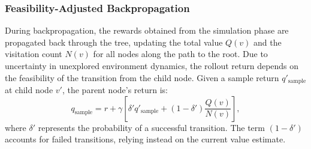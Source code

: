 
\subsubsection{Feasibility-Adjusted Backpropagation}
During backpropagation, the rewards obtained from the simulation phase are propagated back through the tree, updating the total value $Q(v)$ and the visitation count $N(v)$ for all nodes along the path to the root. Due to uncertainty in unexplored environment dynamics, the rollout return depends on the feasibility of the transition from the child node. Given a sample return \(q'_{\mathrm{sample}}\) at child node \(v'\), the parent node's return is:
\begin{equation}
    q_{\mathrm{sample}} = r + \gamma \left[ \delta' q'_{\mathrm{sample}} + (1 - \delta') \frac{Q(v)}{N(v)} \right],
\end{equation}
where $\delta'$ represents the probability of a successful transition. The term \((1 - \delta')\) accounts for failed transitions, relying instead on the current value estimate.

